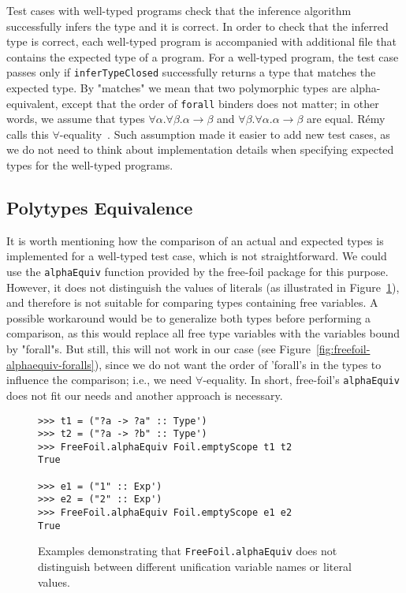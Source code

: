 Test cases with well-typed programs check that the inference algorithm successfully infers the type and it is correct. In order to check that the inferred type is correct, each well-typed program is accompanied with additional file that contains the expected type of a program. For a well-typed program, the test case passes only if \texttt{inferTypeClosed} successfully returns a type that matches the expected type. By "matches" we mean that two polymorphic types are alpha-equivalent, except that the order of \texttt{forall} binders does not matter; in other words, we assume that types $\forall \alpha. \forall \beta. \alpha \to \beta$ and $\forall \beta. \forall \alpha. \alpha \to \beta$ are equal. R\'emy calls this $\forall$-equality~\cite{Remy1992_SortedEqTheoryTypes}. Such assumption made it easier to add new test cases, as we do not need to think about implementation details when specifying expected types for the well-typed programs.

\subsection{Polytypes Equivalence}

It is worth mentioning how the comparison of an actual and expected types is implemented for a well-typed test case, which is not straightforward. We could use the \texttt{alphaEquiv} function provided by the free-foil package for this purpose. However, it does not distinguish the values of literals (as illustrated in Figure~\ref{fig:freefoil-alphaequiv-literals}), and therefore is not suitable for comparing types containing free variables. A possible workaround would be to generalize both types before performing a comparison, as this would replace all free type variables with the variables bound by "forall"s. But still, this will not work in our case (see Figure~\ref{fig:freefoil-alphaequiv-foralls}), since we do not want the order of 'forall's in the types to influence the comparison; i.e., we need $\forall$-equality. In short, free-foil's \texttt{alphaEquiv} does not fit our needs and another approach is necessary.

\begin{figure}[H]
  \begin{verbatim}
>>> t1 = ("?a -> ?a" :: Type')
>>> t2 = ("?a -> ?b" :: Type')
>>> FreeFoil.alphaEquiv Foil.emptyScope t1 t2
True

>>> e1 = ("1" :: Exp')
>>> e2 = ("2" :: Exp')
>>> FreeFoil.alphaEquiv Foil.emptyScope e1 e2
True
  \end{verbatim}
  \caption[\texttt{FreeFoil.alphaEquiv} usage examples (1)]{Examples demonstrating that \texttt{FreeFoil.alphaEquiv} does not distinguish between different unification variable names or literal values.}
  \label{fig:freefoil-alphaequiv-literals}
\end{figure}

